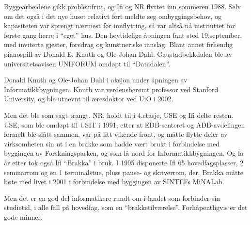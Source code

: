 \documentclass[../../main.tex]{subfiles}
\begin{document}
Byggearbeidene gikk problemfritt, og Ifi og NR flyttet inn sommeren 1988. Selv om det også i det nye huset relativt fort meldte seg ombyggingsbehov, og kapasiteten var sprengt nærmest før innflytting, så var altså nå instituttet for første gang herre i ``eget'' hus. Den høytidelige åpningen fant sted 19.september, med inviterte gjester, foredrag og kunstneriske innslag. Blant annet firhendig pianospill av Donald E. Knuth og Ole-Johan Dahl. Gaustadbekkdalen ble av universitetsavisen UNIFORUM omdøpt til ``Datadalen''.


Donald Knuth og Ole-Johan Dahl i aksjon under åpningen av Informatikkbygningen. Knuth var verdensberømt professor ved Stanford University, og ble utnevnt til æresdoktor ved UiO i 2002.

Men det ble som sagt trangt. NR, holdt til i 4.etasje, USE og Ifi delte resten. USE, som ble omdøpt til USIT i 1991, etter at EDB-senteret og ADB-avdelingen formelt ble slått sammen, var på litt vikende front, og måtte flytte deler av virksomheten sin ut i en brakke som hadde vært brukt i forbindelse med byggingen av Forskningsparken, og som lå nord for Informatikkbygningen. Og få år etter tok også Ifi ``Brakka'' i bruk. I 1995 disponerte Ifi 65 hovedfagsplasser, 2 seminarrom og en 1 terminalstue, pluss pause- og skriverrom, der. Brakka måtte bøte med livet i 2001 i forbindelse med byggingen av SINTEFs MiNALab. 

Men det er en god del informatikere rundt om i landet som forbinder sin studietid, i alle fall på hovedfag, som en ``brakketilværelse''. Forhåpentligvis er det gode minner.
\end{document}
